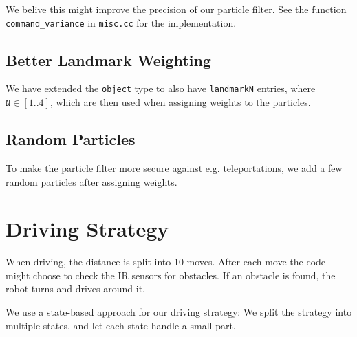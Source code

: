 \documentclass[a4paper,12pt]{article}
\begin{document}
We belive this might improve the precision of our particle filter.  See the
function \texttt{command_variance} in \texttt{misc.cc} for the implementation.


\subsection{Better Landmark Weighting}

We have extended the \texttt{object} type to also have \texttt{landmarkN}
entries, where $\texttt{N} \in [1..4]$, which are then used when assigning
weights to the particles.


\subsection{Random Particles}

To make the particle filter more secure against e.g. teleportations, we add a
few random particles after assigning weights.


\newpage
\section{Driving Strategy}

When driving, the distance is split into 10 moves.  After each move the code
might choose to check the IR sensors for obstacles.  If an obstacle is found,
the robot turns and drives around it.

We use a state-based approach for our driving strategy: We split the strategy
into multiple states, and let each state handle a small part.
\end{document}
